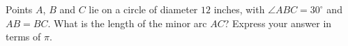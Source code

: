 Points $A$, $B$ and $C$ lie on a circle of diameter $12$ inches, with $\angle ABC=30^\circ$ and $AB=BC$. What is the length of the minor arc $AC$? Express your answer in terms of $\pi$.
